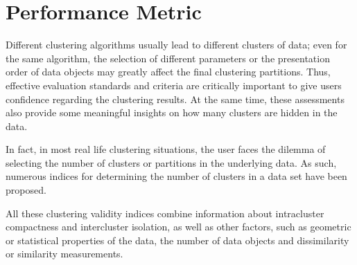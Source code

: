 \section{Performance Metric}
Different clustering algorithms usually lead to different clusters of data; even for the same
algorithm, the selection of different parameters or the presentation order of data objects
may greatly affect the final clustering partitions. Thus, effective evaluation standards and
criteria are critically important to give users confidence regarding the clustering results. At
the same time, these assessments also provide some meaningful insights on how many clusters
are hidden in the data.

In fact, in most real life clustering situations, the user faces the dilemma of selecting the number
of clusters or partitions in the underlying data. As such, numerous indices for determining
the number of clusters in a data set have been proposed.

All these clustering validity indices combine information about intracluster compactness and
intercluster isolation, as well as other factors, such as geometric or statistical properties of
the data, the number of data objects and dissimilarity or similarity measurements.

